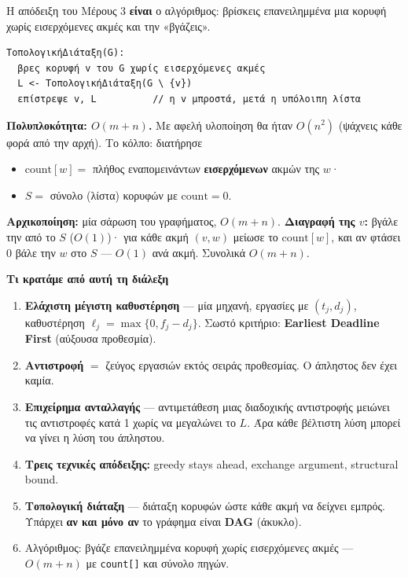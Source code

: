 \documentclass[11pt,a4paper]{article}
\begin{document}
Η απόδειξη του Μέρους 3 \textbf{είναι} ο αλγόριθμος: βρίσκεις επανειλημμένα μια
κορυφή χωρίς εισερχόμενες ακμές και την «βγάζεις».

\begin{codebox}
\begin{verbatim}
ΤοπολογικήΔιάταξη(G):
  βρες κορυφή v του G χωρίς εισερχόμενες ακμές
  L <- ΤοπολογικήΔιάταξη(G \ {v})
  επίστρεψε v, L          // η v μπροστά, μετά η υπόλοιπη λίστα
\end{verbatim}
\end{codebox}

\begin{keypoint}
\textbf{Πολυπλοκότητα: $O(m + n)$.} Με αφελή υλοποίηση θα ήταν $O(n^2)$ (ψάχνεις
κάθε φορά από την αρχή). Το κόλπο: διατήρησε
\begin{itemize}
  \item $\text{count}[w] = $ πλήθος εναπομεινάντων \textbf{εισερχόμενων} ακμών
  της $w$·
  \item $S = $ σύνολο (λίστα) κορυφών με $\text{count} = 0$.
\end{itemize}
\textbf{Αρχικοποίηση:} μία σάρωση του γραφήματος, $O(m + n)$. \textbf{Διαγραφή
της $v$:} βγάλε την από το $S$ ($O(1)$)· για κάθε ακμή $(v, w)$ μείωσε το
$\text{count}[w]$, και αν φτάσει $0$ βάλε την $w$ στο $S$ --- $O(1)$ ανά ακμή.
Συνολικά $O(m + n)$.
\end{keypoint}

\begin{recapbox}
\textbf{Τι κρατάμε από αυτή τη διάλεξη}
\begin{enumerate}
  \item \textbf{Ελάχιστη μέγιστη καθυστέρηση} --- μία μηχανή, εργασίες με
  $(t_j, d_j)$, καθυστέρηση $\ell_j = \max\{0, f_j - d_j\}$. Σωστό κριτήριο:
  \textbf{Earliest Deadline First} (αύξουσα προθεσμία).
  \item \textbf{Αντιστροφή} $=$ ζεύγος εργασιών εκτός σειράς προθεσμίας. Ο
  άπληστος δεν έχει καμία.
  \item \textbf{Επιχείρημα ανταλλαγής} --- αντιμετάθεση μιας διαδοχικής
  αντιστροφής μειώνει τις αντιστροφές κατά 1 χωρίς να μεγαλώνει το $L$. Άρα κάθε
  βέλτιστη λύση μπορεί να γίνει η λύση του άπληστου.
  \item \textbf{Τρεις τεχνικές απόδειξης:} greedy stays ahead, exchange
  argument, structural bound.
  \item \textbf{Τοπολογική διάταξη} --- διάταξη κορυφών ώστε κάθε ακμή να δείχνει
  εμπρός. Υπάρχει \textbf{αν και μόνο αν} το γράφημα είναι \textbf{DAG} (άκυκλο).
  \item Αλγόριθμος: βγάζε επανειλημμένα κορυφή χωρίς εισερχόμενες ακμές ---
  $O(m + n)$ με \texttt{count[]} και σύνολο πηγών.
\end{enumerate}
\end{recapbox}

\lecturefooter
\end{document}
